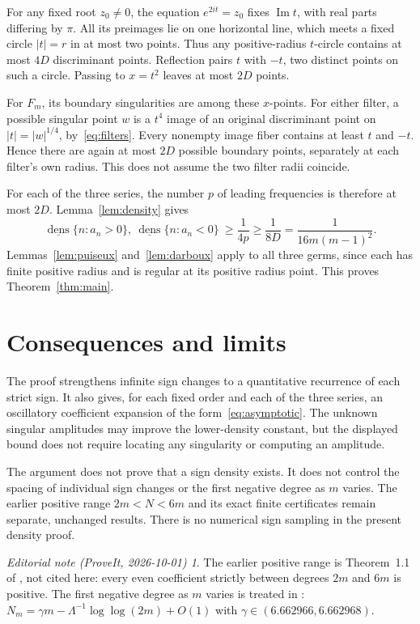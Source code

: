 \documentclass[11pt,a4paper]{article}
\theoremstyle{remark}\newtheorem*{ednote}{Editorial note (ProveIt, 2026-10-01)}
\newcommand{\ldens}{\underline{\operatorname{dens}}}
\begin{document}
For any fixed root $z_0\ne0$, the equation $e^{2it}=z_0$ fixes $\operatorname{Im}t$, with real parts differing by $\pi$. All its preimages lie on one horizontal line, which meets a fixed circle $|t|=r$ in at most two points. Thus any positive-radius $t$-circle contains at most $4D$ discriminant points. Reflection pairs $t$ with $-t$, two distinct points on such a circle. Passing to $x=t^2$ leaves at most $2D$ points.

For $F_m$, its boundary singularities are among these $x$-points. For either filter, a possible singular point $w$ is a $t^4$ image of an original discriminant point on $|t|=|w|^{1/4}$, by~\eqref{eq:filters}. Every nonempty image fiber contains at least $t$ and $-t$. Hence there are again at most $2D$ possible boundary points, separately at each filter's own radius. This does not assume the two filter radii coincide.

For each of the three series, the number $p$ of leading frequencies is therefore at most $2D$. Lemma~\ref{lem:density} gives
\[
 \ldens\{n:a_n>0\},\ \ldens\{n:a_n<0\}
 \ \ge\frac1{4p}\ge\frac1{8D}
 =\frac1{16m(m-1)^2}.
\]
Lemmas~\ref{lem:puiseux} and~\ref{lem:darboux} apply to all three germs, since each has finite positive radius and is regular at its positive radius point. This proves Theorem~\ref{thm:main}.

\section{Consequences and limits}
The proof strengthens infinite sign changes to a quantitative recurrence of each strict sign. It also gives, for each fixed order and each of the three series, an oscillatory coefficient expansion of the form~\eqref{eq:asymptotic}. The unknown singular amplitudes may improve the lower-density constant, but the displayed bound does not require locating any singularity or computing an amplitude.

The argument does not prove that a sign density exists. It does not control the spacing of individual sign changes or the first negative degree as $m$ varies. The earlier positive range $2m<N<6m$ and its exact finite certificates remain separate, unchanged results. There is no numerical sign sampling in the present density proof.
\begin{ednote}
The earlier positive range is Theorem~1.1 of , not cited here:
every even coefficient strictly between degrees $2m$ and $6m$ is positive. The first negative
degree as $m$ varies is treated in : $N_m=\gamma m-\Lambda^{-1}\log\log(2m)+O(1)$ with $\gamma\in(6.662966,6.662968)$.
\end{ednote}
\end{document}
